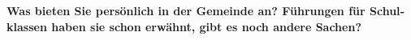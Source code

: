 \begin{otherlanguage}{ngerman}



\textbf{Was bieten Sie persönlich in der Gemeinde an? Führungen für Schulklassen haben sie schon erwähnt, gibt es noch andere Sachen?} 


\end{otherlanguage}

